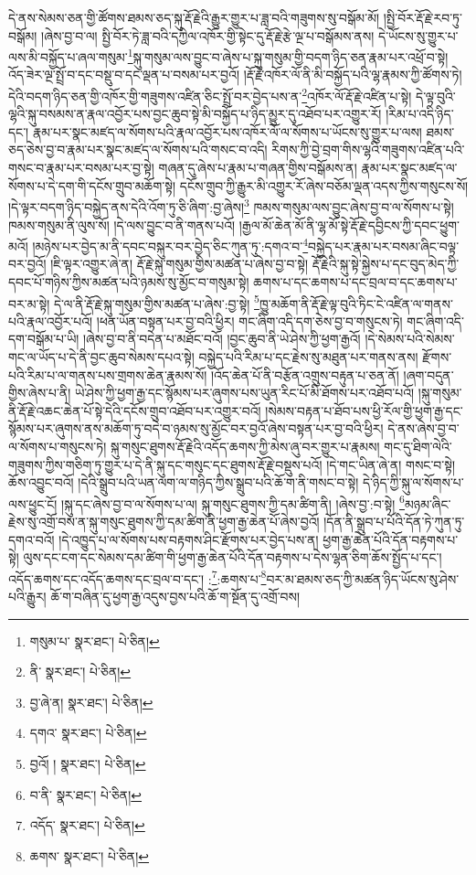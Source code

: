 དེ་ནས་སེམས་ཅན་གྱི་ཚོགས་ཐམས་ཅད་སྐུ་རྡོ་རྗེའི་རྒྱུར་གྱུར་པ་ཟླ་བའི་གཟུགས་སུ་བསྒོམ་མོ། །སྤྱི་བོར་རྡོ་རྗེ་རབ་ཏུ་བསྒོམ། །ཞེས་བྱ་བ་ལ། སྤྱི་བོར་ཏེ་ཟླ་བའི་དཀྱིལ་འཁོར་གྱི་སྟེང་དུ་རྡོ་རྗེ་རྩེ་ལྔ་པ་བསྒོམས་ནས། དེ་ཡོངས་སུ་གྱུར་པ་ལས་མི་བསྐྱོད་པ་ཞལ་གསུམ་\footnote{གསུམ་པ་  སྣར་ཐང་།  པེ་ཅིན། }སྐུ་གསུམ་ལས་བྱུང་བ་ཞེས་པ་སྐུ་གསུམ་གྱི་བདག་ཉིད་ཅན་རྣམ་པར་འཕྲོ་བ་སྟེ། འོད་ཟེར་ལྔ་སྤྲོ་བ་དང་བསྡུ་བ་དང་ལྡན་པ་བསམ་པར་བྱའོ། །རྡོ་རྗེ་འཁོར་ལོ་ནི་མི་བསྐྱོད་པའི་ལྷ་རྣམས་ཀྱི་ཚོགས་ཏེ། དེའི་བདག་ཉིད་ཅན་གྱི་འཁོར་གྱི་གཟུགས་འཛིན་ཅིང་སྤྲོ་བར་བྱེད་པས་ན་\footnote{ནི་  སྣར་ཐང་།  པེ་ཅིན། }འཁོར་ལོ་རྡོ་རྗེ་འཛིན་པ་སྟེ། དེ་ལྟ་བུའི་ལྷའི་སྐུ་བསམས་ན་རྣལ་འབྱོར་པས་བྱང་ཆུབ་སྟེ་མི་བསྐྱོད་པ་ཉིད་མྱུར་དུ་འཐོབ་པར་འགྱུར་རོ། །རིམ་པ་འདི་ཉིད་དང་། རྣམ་པར་སྣང་མཛད་ལ་སོགས་པའི་རྣལ་འབྱོར་པས་འཁོར་ལོ་ལ་སོགས་པ་ཡོངས་སུ་གྱུར་པ་ལས། ཐམས་ཅད་ཅེས་བྱ་བ་རྣམ་པར་སྣང་མཛད་ལ་སོགས་པའི་གསང་བ་འདི། རིགས་ཀྱི་བྱེ་བྲག་གིས་ལྷའི་གཟུགས་འཛིན་པའི་གསང་བ་རྣམ་པར་བསམ་པར་བྱ་སྟེ། གཞན་དུ་ཞེས་པ་རྣམ་པ་གཞན་གྱིས་བསྒོམས་ན། རྣམ་པར་སྣང་མཛད་ལ་སོགས་པ་དེ་དག་གི་དངོས་གྲུབ་མཆོག་སྟེ། དངོས་གྲུབ་ཀྱི་རྒྱུར་མི་འགྱུར་རོ་ཞེས་བཅོམ་ལྡན་འདས་ཀྱིས་གསུངས་སོ། །དེ་ལྟར་བདག་ཉིད་བསྐྱེད་ནས་དེའི་འོག་ཏུ་ཅི་ཞིག་:བྱ་ཞེས།\footnote{བྱ་ཞེ་ན།  སྣར་ཐང་།  པེ་ཅིན། } ཁམས་གསུམ་ལས་བྱུང་ཞེས་བྱ་བ་ལ་སོགས་པ་སྟེ། ཁམས་གསུམ་ནི་ལུས་སོ། །དེ་ལས་བྱུང་བ་ནི་གནས་པའོ། །རྒྱལ་མོ་ཆེན་མོ་ནི་ལྷ་མོ་སྟེ་རྡོ་རྗེ་དབྱིངས་ཀྱི་དབང་ཕྱུག་མའོ། །མཉེས་པར་བྱེད་མ་ནི་དབང་བསྐུར་བར་བྱེད་ཅིང་ཀུན་ཏུ་:དགའ་བ་\footnote{དགའ་  སྣར་ཐང་།  པེ་ཅིན། }བསྐྱེད་པར་རྣམ་པར་བསམ་ཞིང་བལྟ་བར་བྱའོ། །ཇི་ལྟར་འགྱུར་ཞེ་ན། རྡོ་རྗེ་སྐུ་གསུམ་གྱིས་མཚན་པ་ཞེས་བྱ་བ་སྟེ། རྡོ་རྗེའི་སྐུ་སྟེ་སྐྱེས་པ་དང་བུད་མེད་ཀྱི་དབང་པོ་གཉིས་ཀྱིས་མཚན་པའི་ཉམས་སུ་མྱོང་བ་གསུམ་སྟེ། ཆགས་པ་དང་ཆགས་པ་དང་བྲལ་བ་དང་ཆགས་པ་བར་མ་སྟེ། དེ་ལ་ནི་རྡོ་རྗེ་སྐུ་གསུམ་གྱིས་མཚན་པ་ཞེས་:བྱ་སྟེ། \footnote{བྱའོ། །   སྣར་ཐང་།  པེ་ཅིན། }ཁྱུ་མཆོག་ནི་རྡོ་རྗེ་ལྟ་བུའི་ཏིང་ངེ་འཛིན་ལ་གནས་པའི་རྣལ་འབྱོར་པའོ། །ཕན་ཡོན་བསྟན་པར་བྱ་བའི་ཕྱིར། གང་ཞིག་འདི་དག་ཅེས་བྱ་བ་གསུངས་ཏེ། གང་ཞིག་འདི་དག་བསྒོམ་པ་ཡི། །ཞེས་བྱ་བ་ནི་བདེན་པ་མཐོང་བའོ། །བྱང་ཆུབ་ནི་ཡེ་ཤེས་ཀྱི་ཕྱག་རྒྱའོ། །དེ་སེམས་པའི་སེམས་གང་ལ་ཡོད་པ་དེ་ནི་བྱང་ཆུབ་སེམས་དཔའ་སྟེ། བསྐྱེད་པའི་རིམ་པ་དང་རྗེས་སུ་མཐུན་པར་གནས་ནས། རྫོགས་པའི་རིམ་པ་ལ་གནས་པས་གྲགས་ཆེན་རྣམས་སོ། །འོད་ཆེན་པོ་ནི་བརྩོན་འགྲུས་བརྟུན་པ་ཅན་ནོ། །ཞག་བདུན་གྱིས་ཞེས་པ་ནི། ཡེ་ཤེས་ཀྱི་ཕྱག་རྒྱ་དང་སྙོམས་པར་ཞུགས་པས་ཡུན་རིང་པོ་མི་ཐོགས་པར་འཐོབ་པའོ། །སྐུ་གསུམ་ནི་རྡོ་རྗེ་འཆང་ཆེན་པོ་སྟེ་དེའི་དངོས་གྲུབ་འཐོབ་པར་འགྱུར་བའོ། །སེམས་བརྟན་པ་ཐོབ་པས་ཕྱི་རོལ་གྱི་ཕྱག་རྒྱ་དང་སྙོམས་པར་ཞུགས་ནས་མཆོག་ཏུ་བདེ་བ་ཉམས་སུ་མྱོང་བར་བྱའོ་ཞེས་བསྟན་པར་བྱ་བའི་ཕྱིར། དེ་ནས་ཞེས་བྱ་བ་ལ་སོགས་པ་གསུངས་ཏེ། སྐུ་གསུང་ཐུགས་རྡོ་རྗེའི་འདོད་ཆགས་ཀྱི་མེས་ཞུ་བར་གྱུར་པ་རྣམས། གང་དུ་ཐིག་ལེའི་གཟུགས་ཀྱིས་གཅིག་ཏུ་གྱུར་པ་དེ་ནི་སྐུ་དང་གསུང་དང་ཐུགས་རྡོ་རྗེ་བསྡུས་པའོ། །དེ་གང་ཡིན་ཞེ་ན། གསང་བ་སྟེ། ཆོས་འབྱུང་བའོ། །དེའི་སྒྲུབ་པའི་ཡན་ལག་ལ་གཉིད་ཀྱིས་སྒྲུབ་པའི་ཆོ་ག་ནི་གསང་བ་སྟེ། དེ་ཉིད་ཀྱི་སྐུ་ལ་སོགས་པ་ལས་ཕྱུང་ངོ། །སྐུ་དང་ཞེས་བྱ་བ་ལ་སོགས་པ་ལ། སྐུ་གསུང་ཐུགས་ཀྱི་དམ་ཚིག་ནི། །ཞེས་བྱ་:བ་སྟེ། \footnote{བ་ནི་  སྣར་ཐང་།  པེ་ཅིན། }མཉམ་ཞིང་རྗེས་སུ་འགྲོ་བས་ན་སྐུ་གསུང་ཐུགས་ཀྱི་དམ་ཚིག་ནི་ཕྱག་རྒྱ་ཆེན་པོ་ཞེས་བྱའོ། །དོན་ནི་སྒྲུབ་པ་པོའི་དོན་ཏེ་ཀུན་ཏུ་དགའ་བའོ། །དེ་འཁྱུད་པ་ལ་སོགས་པས་བརྟགས་ཤིང་རྫོགས་པར་བྱེད་པས་ན། ཕྱག་རྒྱ་ཆེན་པོའི་དོན་བརྟགས་པ་སྟེ། ལུས་དང་ངག་དང་སེམས་དམ་ཚིག་གི་ཕྱག་རྒྱ་ཆེན་པོའི་དོན་བརྟགས་པ་དེས་ལྷན་ཅིག་ཆོས་སྤྱོད་པ་དང་། འདོད་ཆགས་དང་འདོད་ཆགས་དང་བྲལ་བ་དང་། :\footnote{འདོད་  སྣར་ཐང་།  པེ་ཅིན། }:ཆགས་པ་\footnote{ཆགས་  སྣར་ཐང་།  པེ་ཅིན། }བར་མ་ཐམས་ཅད་ཀྱི་མཚན་ཉིད་ཡོངས་སུ་ཤེས་པའི་རྒྱུར། ཆོ་ག་བཞིན་དུ་ཕྱག་རྒྱ་འདུས་བྱས་པའི་ཆོ་ག་སྔོན་དུ་འགྲོ་བས། 